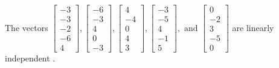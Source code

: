 \begin{exercise}
\begin{exerciseStatement}
  \end{exerciseStatement}
  \begin{exerciseAnswer}
   The vectors \(\left[\begin{array}{r}
-3 \\
-3 \\
-2 \\
-6 \\
4
\end{array}\right] , \left[\begin{array}{r}
-6 \\
-3 \\
4 \\
0 \\
-3
\end{array}\right] , \left[\begin{array}{r}
4 \\
-4 \\
0 \\
4 \\
3
\end{array}\right] , \left[\begin{array}{r}
-3 \\
-5 \\
4 \\
-1 \\
5
\end{array}\right] , \text{ and } \left[\begin{array}{r}
0 \\
-2 \\
3 \\
-5 \\
0
\end{array}\right]\) are 
  	 linearly independent  .
  


  \end{exerciseAnswer}
\end{exercise}